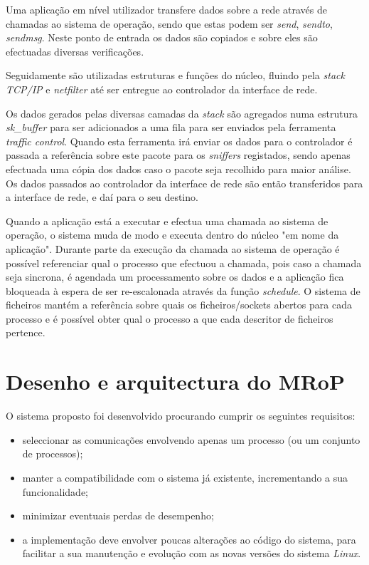 Uma aplicação em nível utilizador transfere dados sobre a rede através de chamadas ao sistema de operação, sendo que estas podem ser \textit{send}, \textit{sendto}, \textit{sendmsg}.
Neste ponto de entrada os dados são copiados e sobre eles são efectuadas diversas verificações.

Seguidamente são utilizadas estruturas e funções do núcleo, fluindo pela \textit{stack TCP/IP} e \textit{netfilter} até ser entregue ao controlador da interface de rede.

Os dados gerados pelas diversas camadas da \textit{stack} são agregados numa estrutura \textit{sk\_buffer} para ser adicionados a uma fila para ser enviados pela ferramenta \textit{traffic control}.
Quando esta ferramenta irá enviar os dados para o controlador é passada a referência sobre este pacote para os \textit{sniffers} registados, sendo apenas efectuada uma cópia dos dados caso o pacote seja recolhido para maior análise. Os dados passados ao controlador da interface de rede são então transferidos para a interface de rede, e daí para o seu destino.

Quando a aplicação está a executar e efectua uma chamada ao sistema de operação, o sistema muda de modo e executa dentro do núcleo "em nome da aplicação".
 Durante parte da execução da chamada ao sistema de operação é possível referenciar qual o processo que efectuou a chamada, pois caso a chamada seja sincrona, é agendada um processamento sobre os dados e a aplicação fica bloqueada à espera de ser re-escalonada através da função \textit{schedule}.
 O sistema de ficheiros mantém a referência sobre quais os ficheiros/sockets abertos para cada processo e é possível obter qual o processo a que cada descritor de ficheiros pertence. %

\section{Desenho e arquitectura do MRoP}
\label{sec:mrop_architecture}

O sistema proposto foi desenvolvido procurando cumprir os seguintes requisitos:
\begin{itemize}
\item seleccionar as comunicações envolvendo apenas um processo (ou um conjunto de processos);
\item manter a compatibilidade com o sistema já existente, incrementando a sua funcionalidade;
\item minimizar eventuais perdas de desempenho;
\item a implementação deve envolver poucas alterações ao código do sistema, para facilitar a sua manutenção e evolução com as novas versões do sistema \textit{Linux}.
\end{itemize}

